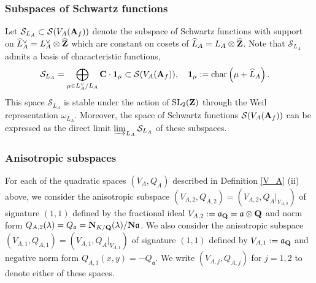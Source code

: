 \documentclass{amsart}
\theoremstyle{definition}
\begin{document}
\subsubsection{Subspaces of Schwartz functions}

Let $\mathcal{S}_{L_A} \subset \mathcal{S}(V_A({\bf{A}}_f))$ 
denote the subspace of Schwartz functions with support on $\widehat{L}_A^{\vee} = L_A^{\vee} \otimes \widehat{ {\bf{Z}} }$ 
which are constant on cosets of $\widehat{L}_A = L_A \otimes \widehat{ {\bf{Z}} }$.
Note that $\mathcal{S}_{L_A}$ admits a basis of characteristic functions,
\begin{align}\label{latticebasis} \mathcal{S}_{L_A} 
&= \bigoplus_{\mu \in L_A^{\vee}/L_A} {\bf{C}} \cdot {\bf{1}}_{\mu} \subset \mathcal{S}(V_A({\bf{A}}_f)),
\quad {\bf{1}}_{\mu} := \operatorname{char} \left( \mu + \widehat{L}_A \right).\end{align}
This space $\mathcal{S}_{L_A}$ is stable under the action of $\operatorname{SL}_2({\bf{Z}})$ through the Weil representation $\omega_{L_A}$. 
Moreover, the space of Schwartz functions $\mathcal{S}(V_A({\bf{A}}_f))$ can be expressed as the direct limit $\varinjlim_{L_A} \mathcal{S}_{L_A}$ of these subspaces.

\subsubsection{Anisotropic subspaces}

For each of the quadratic spaces $(V_A, Q_A)$ described in Definition \ref{V_A} (ii) above, 
we consider the anisotropic subspace $(V_{A, 2}, Q_{A, 2}) = (V_{A,2}, Q_{A}\vert_{V_{A,2}})$ 
of signature $(1,1)$ defined by the fractional ideal $V_{A, 2} := \mathfrak{a}_{\bf{Q}} = \mathfrak{a} \otimes {\bf{Q}}$
and norm form $Q_{A, 2}(\lambda) = Q_{\mathfrak{a}} = {\bf{N}}_{K/{\bf{Q}}}(\lambda)/{\bf{N}} \mathfrak{a}$. 
We also consider the anisotropic subspace $(V_{A, 1}, Q_{A, 1}) = (V_{A,1}, Q_{A}\vert_{V_{A,1}})$ 
of signature $(1,1)$ defined by $V_{A, 1} := \mathfrak{a}_{\bf{Q}}$ and negative norm form 
$Q_{A, 1}(x, y) = - Q_{\mathfrak{a}}$. We write $(V_{A, j}, Q_{A, j})$ for $j=1,2$ to denote either of these spaces.
\end{document}
